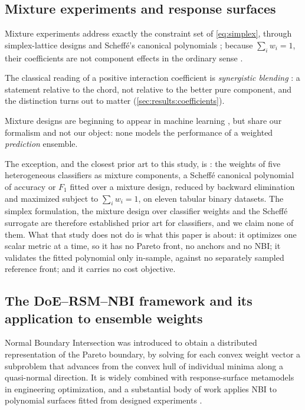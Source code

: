 \subsection{Mixture experiments and response surfaces}
\label{sec:rel:mixture}

Mixture experiments address exactly the constraint set of \cref{eq:simplex}, through simplex-lattice designs and
Scheffé's canonical polynomials
\citep{scheffe1958mixtures,scheffe1963simplexcentroid,cornell2002mixtures,myers2016rsm}; because $\sum_i w_i = 1$,
their coefficients are not component effects in the ordinary sense \citep{piepel1982component}.

The classical reading of a positive interaction coefficient is \emph{synergistic blending}
\citep{cornell2002mixtures}: a statement relative to the chord, not relative to the better pure component, and the
distinction turns out to matter (\cref{sec:results:coefficients}).

Mixture designs are beginning to appear in machine learning
\citep{karl2023svem,leal2025mixtureweights,xie2023doremi,ye2025mixinglaws,liu2025regmix,chen2025aioli,thudi2025mixmin},
but share our formalism and not our object: none models the performance of a weighted \emph{prediction} ensemble.

The exception, and the closest prior art to this study, is \citet{kwon2024ensemble}: the weights of five heterogeneous
classifiers as mixture components, a Scheffé canonical polynomial of accuracy or $F_1$ fitted over a mixture design,
reduced by backward elimination and maximized subject to $\sum_i w_i = 1$, on eleven tabular binary datasets. The
simplex formulation, the mixture design over classifier weights and the Scheffé surrogate are therefore established
prior art for classifiers, and we claim none of them. What that study does not do is what this paper is about: it
optimizes one scalar metric at a time, so it has no Pareto front, no anchors and no NBI; it validates the fitted
polynomial only in-sample, against no separately sampled reference front; and it carries no cost objective.

\subsection{The DoE--RSM--NBI framework and its application to ensemble weights}
\label{sec:rel:lineage}

Normal Boundary Intersection \citep{das1998nbi} was introduced to obtain a distributed representation of the Pareto
boundary, by solving for each convex weight vector a subproblem that advances from the convex hull of individual
minima along a quasi-normal direction. It
is widely combined with response-surface metamodels in engineering optimization, and a substantial body of work applies
NBI to polynomial surfaces fitted from designed experiments
\citep{brito2014nbimse,costa2016nbimmse,lopes2016rpdmnbi,naves2017nbirfs,belinato2019mnbipca,almeida2022taguchinbi}.

